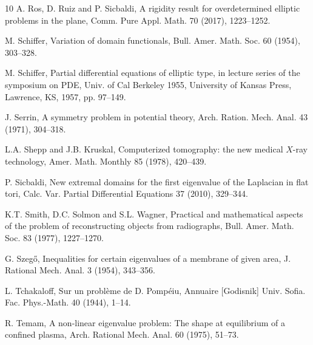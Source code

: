 \documentclass[12pt]{article}
\numberwithin{equation}{section}
\numberwithin{equation}{section}
\begin{document}
\begin{thebibliography}{10}
 A. Ros, D. Ruiz and P. Sicbaldi, A rigidity result for overdetermined elliptic problems in the
plane, Comm. Pure Appl. Math. 70 (2017), 1223--1252.

 M. Schiffer, Variation of domain functionals, Bull. Amer. Math. Soc. 60 (1954), 303--328.

 M. Schiffer, Partial differential equations of elliptic type, in lecture series of the symposium on
PDE, Univ. of Cal Berkeley 1955, University of Kansas Press, Lawrence, KS, 1957, pp. 97--149.

 J. Serrin, A symmetry problem in potential theory, Arch. Ration. Mech. Anal. 43 (1971), 304--318.

 L.A. Shepp and J.B. Kruskal, Computerized tomography: the new medical $X$-ray technology, Amer. Math. Monthly 85 (1978), 420--439.

 P. Sicbaldi, New extremal domains for the first eigenvalue of the Laplacian in flat tori, Calc. Var. Partial Differential Equations 37 (2010), 329--344.

 K.T. Smith, D.C. Solmon and S.L. Wagner, Practical and mathematical aspects of the problem of reconstructing objects from radiographs, Bull. Amer. Math. Soc. 83 (1977), 1227--1270.


 G. Szeg\H{o}, Inequalities for certain eigenvalues of a membrane of given area, J. Rational Mech. Anal. 3 (1954), 343--356.

 L. Tchakaloff, Sur un probl\`{e}me de D. Pomp\'{e}iu, Annuaire [Godisnik] Univ. Sofia. Fac. Phys.-Math. 40 (1944), 1--14.

 R. Temam, A non-linear eigenvalue problem: The shape at equilibrium of a confined plasma, Arch. Rational Mech. Anal. 60 (1975), 51--73.





\end{thebibliography}
\end{document}
